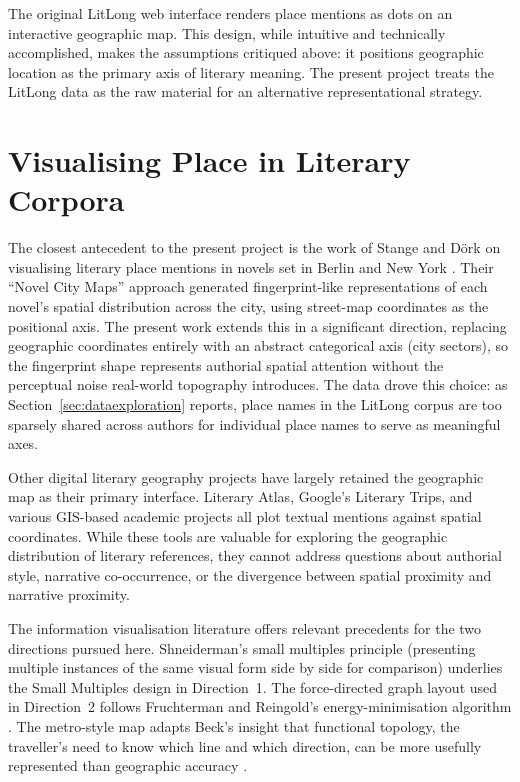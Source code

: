 \documentclass[logo,msc]{infthesis}
\begin{document}
The original LitLong web interface renders place mentions as dots on an interactive geographic map. This design, while intuitive and technically accomplished, makes the assumptions critiqued above: it positions geographic location as the primary axis of literary meaning. The present project treats the LitLong data as the raw material for an alternative representational strategy.
 
\section{Visualising Place in Literary Corpora}
 
The closest antecedent to the present project is the work of Stange and D{\"o}rk on visualising literary place mentions in novels set in Berlin and New York \cite{stange2015}. Their ``Novel City Maps'' approach generated fingerprint-like representations of each novel's spatial distribution across the city, using street-map coordinates as the positional axis. The present work extends this in a significant direction, replacing geographic coordinates entirely with an abstract categorical axis (city sectors), so the fingerprint shape represents authorial spatial attention without the perceptual noise real-world topography introduces. The data drove this choice: as Section~\ref{sec:dataexploration} reports, place names in the LitLong corpus are too sparsely shared across authors for individual place names to serve as meaningful axes.
 
Other digital literary geography projects have largely retained the geographic map as their primary interface. Literary Atlas, Google's Literary Trips, and various GIS-based academic projects all plot textual mentions against spatial coordinates. While these tools are valuable for exploring the geographic distribution of literary references, they cannot address questions about authorial style, narrative co-occurrence, or the divergence between spatial proximity and narrative proximity.
 
The information visualisation literature offers relevant precedents for the two directions pursued here. Shneiderman's small multiples principle \cite{tufte1983} (presenting multiple instances of the same visual form side by side for comparison) underlies the Small Multiples design in Direction~1. The force-directed graph layout used in Direction~2 follows Fruchterman and Reingold's energy-minimisation algorithm \cite{fruchterman1991}. The metro-style map adapts Beck's insight that functional topology, the traveller's need to know which line and which direction, can be more usefully represented than geographic accuracy \cite{beck1933}.
 
\end{document}
